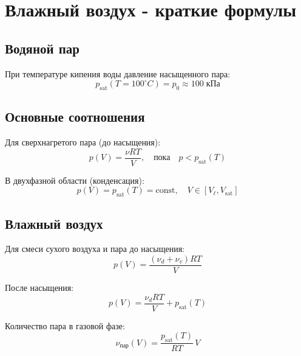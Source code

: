 \documentclass{article}
\begin{document}
\section*{Влажный воздух - краткие формулы}

\subsection*{Водяной пар}
При температуре кипения воды давление насыщенного пара:
\[p_\text{sat}(T = 100^\circ C) = p_0 \approx 100\; \text{кПа}\]

\subsection*{Основные соотношения}
Для сверхнагретого пара (до насыщения):
\[p(V)=\frac{\nu R T}{V}, \quad \text{пока} \quad p < p_{\text{sat}}(T)\]

В двухфазной области (конденсация):
\[p(V)=p_{\text{sat}}(T)=\text{const}, \quad V\in[V_{\ell},V_{\text{sat}}]\]

\subsection*{Влажный воздух}
Для смеси сухого воздуха и пара до насыщения:
\[p(V)=\frac{(\nu_d+\nu_v) R T}{V}\]

После насыщения:
\[p(V)=\frac{\nu_d R T}{V}+p_{\text{sat}}(T)\]

Количество пара в газовой фазе:
\[\nu_{\text{пар}}(V)=\frac{p_{\text{sat}}(T)}{R T}\,V\]
\end{document}
